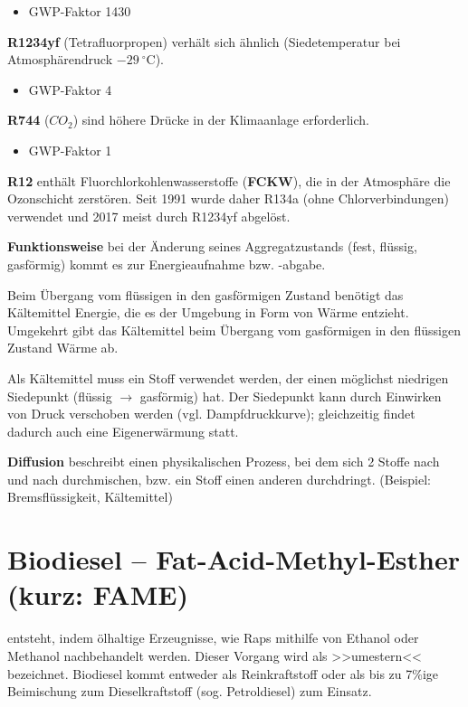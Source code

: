 \begin{itemize}
\item
  GWP-Faktor 1430
\end{itemize}

\textbf{R1234yf} (Tetrafluorpropen) verhält sich ähnlich
(Siedetemperatur bei Atmosphärendruck $-29~^\circ\text{C}$).

\begin{itemize}
\item
  GWP-Faktor 4
\end{itemize}

\textbf{R744} ($CO_2$) sind höhere Drücke in der Klimaanlage
erforderlich.

\begin{itemize}
\item
  GWP-Faktor 1
\end{itemize}

\textbf{R12} enthält Fluorchlorkohlenwasserstoffe (\textbf{FCKW}), die
in der Atmosphäre die Ozonschicht zerstören. Seit 1991 wurde daher R134a
(ohne Chlorverbindungen) verwendet und 2017 meist durch R1234yf
abgelöst.

\textbf{Funktionsweise} bei der Änderung seines Aggregatzustands (fest,
flüssig, gasförmig) kommt es zur Energieaufnahme bzw. -abgabe.

Beim Übergang vom flüssigen in den gasförmigen Zustand benötigt das
Kältemittel Energie, die es der Umgebung in Form von Wärme entzieht.
Umgekehrt gibt das Kältemittel beim Übergang vom gasförmigen in den
flüssigen Zustand Wärme ab.

Als Kältemittel muss ein Stoff verwendet werden, der einen möglichst
niedrigen Siedepunkt (flüssig $\to$ gasförmig) hat. Der Siedepunkt
kann durch Einwirken von Druck verschoben werden (vgl. Dampfdruckkurve);
gleichzeitig findet dadurch auch eine Eigenerwärmung statt.

\textbf{Diffusion} beschreibt einen physikalischen Prozess, bei dem sich
2 Stoffe nach und nach durchmischen, bzw. ein Stoff einen anderen
durchdringt. (Beispiel: Bremsflüssigkeit, Kältemittel)

\section{Biodiesel -- Fat-Acid-Methyl-Esther (kurz:
FAME)}\label{biodiesel-fat-acid-methyl-esther-kurz-fame}

entsteht, indem ölhaltige Erzeugnisse, wie Raps mithilfe von Ethanol
oder Methanol nachbehandelt werden. Dieser Vorgang wird als >>umestern<<
bezeichnet. Biodiesel kommt entweder als Reinkraftstoff oder als bis zu
7\%ige Beimischung zum Dieselkraftstoff (sog. Petroldiesel) zum Einsatz.

